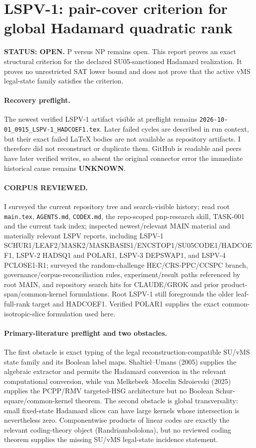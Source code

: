 \documentclass[11pt]{article}
\begin{document}
\section*{LSPV-1: pair-cover criterion for global Hadamard quadratic rank}
\textbf{STATUS: OPEN.} P versus NP remains open. This report proves an exact structural criterion for the declared SU05-sanctioned Hadamard realization. It proves no unrestricted SAT lower bound and does not prove that the active vMS legal-state family satisfies the criterion.

\paragraph{Recovery preflight.}
The newest verified LSPV-1 artifact visible at preflight remains \texttt{2026-10-01\_0915\_LSPV-1\_HADCOEF1.tex}. Later failed cycles are described in run context, but their exact failed LaTeX bodies are not available as repository artifacts. I therefore did not reconstruct or duplicate them. GitHub is readable and peers have later verified writes, so absent the original connector error the immediate historical cause remains \textbf{UNKNOWN}.

\paragraph{CORPUS REVIEWED.}
I surveyed the current repository tree and search-visible history; read root \texttt{main.tex}, \texttt{AGENTS.md}, \texttt{CODEX.md}, the repo-scoped pnp-research skill, TASK-001 and the current task index; inspected newest/relevant MAIN material and materially relevant LSPV reports, including LSPV-1 SCHUR1/LEAF2/MASK2/MASKBASIS1/ENCSTOP1/SU05CODE1/HADCOEF1, LSPV-2 HADSQ1 and POLAR1, LSPV-3 DEPSWAP1, and LSPV-4 PCLOSE1-R1; surveyed the random-challenge HEC/CRS-PPC/CCSPC branch, governance/corpus-reconciliation rules, experiment/result paths referenced by root MAIN, and repository search hits for CLAUDE/GROK and prior product-span/common-kernel formulations. Root LSPV-1 still foregrounds the older leaf-full-rank target and HADCOEF1. Verified POLAR1 supplies the exact common-isotropic-slice formulation used here.

\paragraph{Primary-literature preflight and two obstacles.}
The first obstacle is exact typing of the legal reconstruction-compatible SU/vMS state family and its Boolean label maps. Shaltiel--Umans (2005) supplies the algebraic extractor and permits the Hadamard conversion in the relevant computational conversion, while van Melkebeek--Mocelin Sdroievski (2025) supplies the PCPP/RMV targeted-HSG architecture but no Boolean Schur-square/common-kernel theorem. The second obstacle is global transversality: small fixed-state Hadamard slices can have large kernels whose intersection is nevertheless zero. Componentwise products of linear codes are exactly the relevant coding-theory object (Randriambololona), but no reviewed coding theorem supplies the missing SU/vMS legal-state incidence statement.
\end{document}
